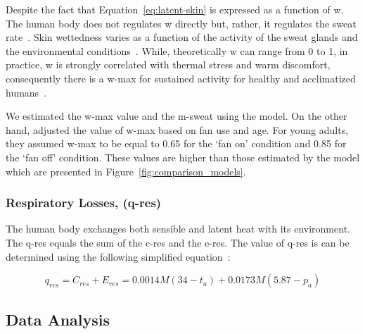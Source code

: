 Despite the fact that Equation~\ref{eq:latent-skin} is expressed as a function of \ac{w}.
The human body does not regulates \ac{w} directly but, rather, it regulates the sweat rate~\cite{ASHRA2017}.
Skin wettedness varies as a function of the activity of the sweat glands and the environmental conditions~\cite{ASHRA2017}.
While, theoretically \ac{w} can range from 0 to 1, in practice, \ac{w} is strongly correlated with thermal stress and warm discomfort, consequently there is a \ac{w-max} for sustained activity for healthy and acclimatized humans~\cite{ASHRA2017}.

We estimated the \ac{w-max} value and the \ac{m-sweat} using the  model.
On the other hand,  adjusted the value of \ac{w-max} based on fan use and age.
For young adults, they assumed \ac{w-max} to be equal to 0.65 for the `fan on' condition and 0.85 for the `fan off' condition.
These values are higher than those estimated by the  model which are presented in Figure~\ref{fig:comparison_models}.

\subsubsection{Respiratory Losses, (\acs{q-res})}
The human body exchanges both sensible and latent heat with its environment.
The \acf{q-res} equals the sum of the \ac{c-res} and the \ac{e-res}.
The value of \ac{q-res} is can be determined using the following simplified equation~\cite{ASHRA2017}:

\begin{equation}
    q_{res} = C_{res} + E_{res} = 0.0014M(34-t_{a}) + 0.0173M(5.87-p_{a})\label{eq:respiratory-losses}
\end{equation}

\subsection{Data Analysis}\label{subsec:data-analysis}


